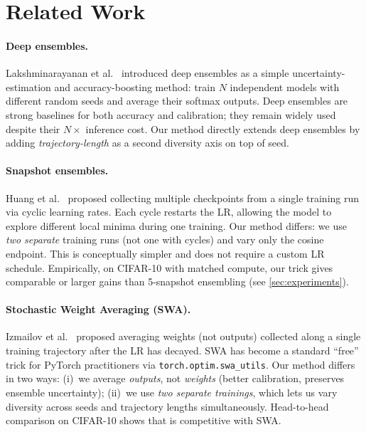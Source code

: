 \section{Related Work}
\label{sec:related}

\paragraph{Deep ensembles.}
Lakshminarayanan et al.\ \cite{lakshminarayanan2017simple} introduced deep
ensembles as a simple uncertainty-estimation and accuracy-boosting method:
train $N$ independent models with different random seeds and average their
softmax outputs. Deep ensembles are strong baselines for both accuracy and
calibration; they remain widely used despite their $N\times$ inference cost.
Our method directly extends deep ensembles by adding \emph{trajectory-length}
as a second diversity axis on top of seed.

\paragraph{Snapshot ensembles.}
Huang et al.\ \cite{huang2017snapshot} proposed collecting multiple
checkpoints from a single training run via cyclic learning rates. Each
cycle restarts the LR, allowing the model to explore different local
minima during one training. Our method differs: we use \emph{two separate}
training runs (not one with cycles) and vary only the cosine endpoint.
This is conceptually simpler and does not require a custom LR schedule.
Empirically, on CIFAR-10 with matched compute, our trick gives comparable
or larger gains than 5-snapshot ensembling (see \cref{sec:experiments}).

\paragraph{Stochastic Weight Averaging (SWA).}
Izmailov et al.\ \cite{izmailov2018averaging} proposed averaging weights
(not outputs) collected along a single training trajectory after the LR
has decayed. SWA has become a standard ``free'' trick for PyTorch
practitioners via \texttt{torch.optim.swa\_utils}. Our method differs in two
ways: (i)~we average \emph{outputs}, not \emph{weights} (better calibration,
preserves ensemble uncertainty); (ii)~we use \emph{two separate trainings},
which lets us vary diversity across seeds and trajectory lengths
simultaneously. Head-to-head comparison on CIFAR-10 shows that \ours{} is
competitive with SWA.

